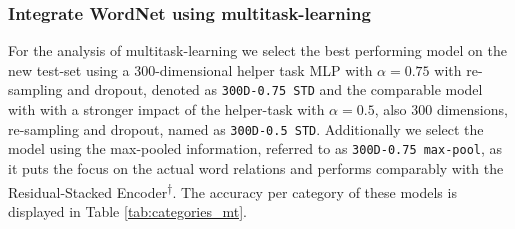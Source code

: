 \subsubsection{Integrate WordNet using multitask-learning}
For the analysis of multitask-learning we select the best performing model on the new test-set using a 300-dimensional helper task \ac{MLP} with $\alpha=0.75$ with re-sampling and dropout, denoted as \texttt{300D-0.75 STD} and the comparable model with with a stronger impact of the helper-task with $\alpha=0.5$, also 300 dimensions, re-sampling and dropout, named as \texttt{300D-0.5 STD}. Additionally we select the model using the max-pooled information, referred to as \texttt{300D-0.75 max-pool}, as it puts the focus on the actual word relations and performs comparably with the Residual-Stacked Encoder\textsuperscript{$\dagger$}. The accuracy per category of these models is displayed in Table \ref{tab:categories_mt}.
